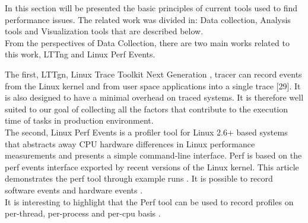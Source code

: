 In this section will be presented the basic principles of current tools used to find performance issues. The related work was divided in: Data collection, Analysis tools and Visualization tools that are described below.\\

From the perspectives of Data Collection, there are two main works related to this work, LTTng and Linux Perf Events.

The first, LTTgn, Linux Trace Toolkit Next Generation \cite{desnoyers}, tracer can record events from the Linux kernel and from user space applications into a single trace [29]. It is also designed to have a minimal overhead on traced systems. It is therefore well suited to our goal of collecting all the factors that contribute to the execution time of tasks in production environment.\\

The second, Linux Perf Events is a profiler tool for Linux 2.6+ based systems that abstracts away CPU hardware differences in Linux performance measurements and presents a simple command-line interface. Perf is based on the perf events interface exported by recent versions of the Linux kernel. This article demonstrates the perf tool through example runs \cite{perf}. It is possible to record software events and hardware events \cite{vitillo}.\\
It is interesting to highlight that the Perf tool can be used to record profiles on per-thread, per-process and per-cpu basis \cite{perftool}.\\

